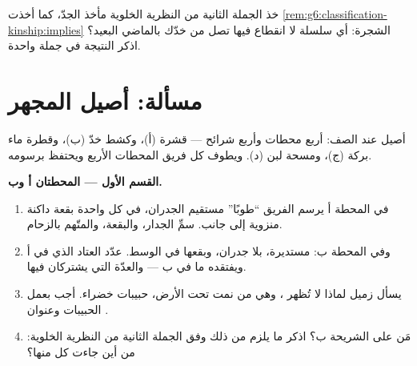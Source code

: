 \begin{exercise}[$\star\star\star$]\label{exo:g6:cell-unit-of-life:12}
خذ الجملة الثانية من النظرية الخلوية مأخذ الجدّ، كما أخذت
\cref{rem:g6:classification-kinship:implies} الشجرة: أي سلسلة لا
انقطاع فيها تصل  من  خدّك بالماضي البعيد؟ اذكر النتيجة في
جملة واحدة.
\end{exercise}

\section{مسألة: أصيل المجهر}

\begin{problem}\label{pb:g6:cell-unit-of-life:1}
أصيل  عند الصف: أربع محطات وأربع شرائح --- قشرة  (أ)،
وكشط خدّ (ب)، وقطرة ماء بركة (ج)، ومسحة لبن (د). ويطوف كل فريق
المحطات الأربع ويحتفظ برسومه.

\medskip\noindent\textbf{القسم الأول --- المحطتان أ وب.}
\begin{enumerate}
  \item في المحطة أ يرسم الفريق ``طوبًا'' مستقيم الجدران، في كل
        واحدة بقعة داكنة منزوية إلى جانب. سمِّ الجدار، والبقعة،
        والمتّهم بالزحام.
  \item وفي المحطة ب:  مستديرة، بلا جدران، وبقعها في الوسط.
        عدّد العتاد الذي في  أ ويفتقده ما في ب --- والعدّة
        التي يشتركان فيها.
  \item يسأل زميل لماذا لا تُظهر  ، وهي من  نمت
        تحت الأرض، حبيبات خضراء. أجب بعمل الحبيبات وعنوان .
  \item {} مَن على الشريحة ب؟ اذكر ما يلزم من ذلك وفق الجملة
        الثانية من النظرية الخلوية: من أين جاءت كل  منها؟
\end{enumerate}


\end{problem}
